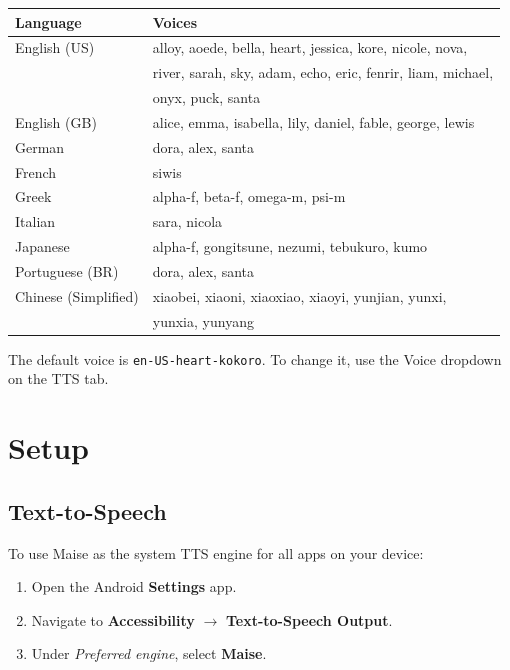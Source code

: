 \documentclass[12pt,a4paper]{article}
\begin{document}
\begin{center}
\begin{tabular}{ll}
\toprule
\textbf{Language} & \textbf{Voices} \\
\midrule
English (US) & alloy, aoede, bella, heart, jessica, kore, nicole, nova, \\
             & river, sarah, sky, adam, echo, eric, fenrir, liam, michael, \\
             & onyx, puck, santa \\
\addlinespace
English (GB) & alice, emma, isabella, lily, daniel, fable, george, lewis \\
\addlinespace
German       & dora, alex, santa \\
\addlinespace
French       & siwis \\
\addlinespace
Greek        & alpha-f, beta-f, omega-m, psi-m \\
\addlinespace
Italian      & sara, nicola \\
\addlinespace
Japanese     & alpha-f, gongitsune, nezumi, tebukuro, kumo \\
\addlinespace
Portuguese (BR) & dora, alex, santa \\
\addlinespace
Chinese (Simplified) & xiaobei, xiaoni, xiaoxiao, xiaoyi, yunjian, yunxi, \\
                     & yunxia, yunyang \\
\bottomrule
\end{tabular}
\end{center}

The default voice is \texttt{en-US-heart-kokoro}. To change it, use the Voice dropdown on the TTS tab.

\section{Setup}
\label{sec:setup}

\subsection{Text-to-Speech}
\label{sec:setup-tts}

To use Maise as the system TTS engine for all apps on your device:

\begin{enumerate}
    \item Open the Android \textbf{Settings} app.
    \item Navigate to \textbf{Accessibility} $\rightarrow$ \textbf{Text-to-Speech Output}.
    \item Under \emph{Preferred engine}, select \textbf{Maise}.
\end{enumerate}
\end{document}
